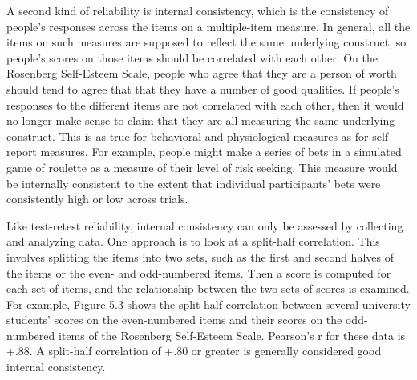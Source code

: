\documentclass[]{book}
\theoremstyle{definition}
\theoremstyle{definition}
\theoremstyle{remark}
\begin{document}
A second kind of reliability is internal consistency, which is the
consistency of people's responses across the items on a multiple-item
measure. In general, all the items on such measures are supposed to
reflect the same underlying construct, so people's scores on those items
should be correlated with each other. On the Rosenberg Self-Esteem
Scale, people who agree that they are a person of worth should tend to
agree that that they have a number of good qualities. If people's
responses to the different items are not correlated with each other,
then it would no longer make sense to claim that they are all measuring
the same underlying construct. This is as true for behavioral and
physiological measures as for self-report measures. For example, people
might make a series of bets in a simulated game of roulette as a measure
of their level of risk seeking. This measure would be internally
consistent to the extent that individual participants' bets were
consistently high or low across trials.

Like test-retest reliability, internal consistency can only be assessed
by collecting and analyzing data. One approach is to look at a
split-half correlation. This involves splitting the items into two sets,
such as the first and second halves of the items or the even- and
odd-numbered items. Then a score is computed for each set of items, and
the relationship between the two sets of scores is examined. For
example, Figure 5.3 shows the split-half correlation between several
university students' scores on the even-numbered items and their scores
on the odd-numbered items of the Rosenberg Self-Esteem Scale. Pearson's
r for these data is +.88. A split-half correlation of +.80 or greater is
generally considered good internal consistency.
\end{document}
